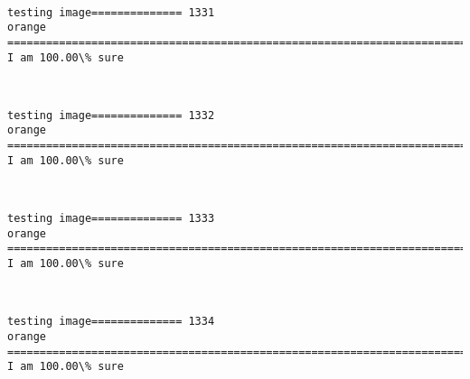 \documentclass[11pt]{article}
\begin{document}
    \begin{center}
    \end{center}
    { \hspace*{\fill} \\}
    
    \begin{Verbatim}[commandchars=\\\{\}]
testing image============== 1331
orange
============================================================================
I am 100.00\% sure

    \end{Verbatim}

    \begin{center}
    \end{center}
    { \hspace*{\fill} \\}
    
    \begin{Verbatim}[commandchars=\\\{\}]
testing image============== 1332
orange
============================================================================
I am 100.00\% sure

    \end{Verbatim}

    \begin{center}
    \end{center}
    { \hspace*{\fill} \\}
    
    \begin{Verbatim}[commandchars=\\\{\}]
testing image============== 1333
orange
============================================================================
I am 100.00\% sure

    \end{Verbatim}

    \begin{center}
    \end{center}
    { \hspace*{\fill} \\}
    
    \begin{Verbatim}[commandchars=\\\{\}]
testing image============== 1334
orange
============================================================================
I am 100.00\% sure

    \end{Verbatim}
\end{document}
